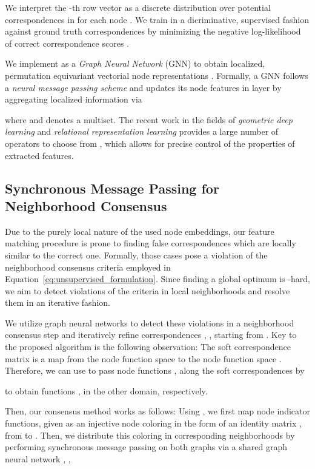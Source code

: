 \documentclass{article}
\begin{document}
We interpret the -th row vector  as a discrete distribution over potential correspondences in  for each node .
We train  in a dicriminative, supervised fashion against ground truth correspondences  by minimizing the negative log-likelihood of correct correspondence scores .

We implement  as a \emph{Graph Neural Network} (GNN) to obtain localized, permutation equivariant vectorial node representations \citep{Bronstein/etal/2017,Hamilton/etal/2017,Battaglia/etal/2018,Goyal/Ferrara/2018}.
Formally, a GNN follows a \emph{neural message passing scheme} \citep{Gilmer/etal/2017} and updates its node features  in layer  by aggregating localized information via

where  and  denotes a multiset.
The recent work in the fields of \emph{geometric deep learning} and \emph{relational representation learning} provides a large number of operators to choose from \citep{Kipf/Welling/2017,Gilmer/etal/2017,Velickovic/etal/2018,Schlichtkrull/etal/2018,Xu/etal/2019b}, which allows for precise control of the properties of extracted features.

\subsection{Synchronous Message Passing for Neighborhood Consensus}\label{sub:parallel_message_passing_for_neighborhood_consensus}

Due to the purely local nature of the used node embeddings, our feature matching procedure is prone to finding false correspondences which are locally similar to the correct one.
Formally, those cases pose a violation of the neighborhood consensus criteria employed in Equation~\eqref{eq:unsupervised_formulation}.
Since finding a global optimum is -hard, we aim to detect violations of the criteria in local neighborhoods and resolve them in an iterative fashion.

We utilize graph neural networks to detect these violations in a neighborhood consensus step and iteratively refine correspondences , , starting from .
Key to the proposed algorithm is the following observation: The soft correspondence matrix  is a map from the node function space  to the node function space .
Therefore, we can use  to pass node functions ,  along the soft correspondences by

to obtain functions ,  in the other domain, respectively.

Then, our consensus method works as follows: Using , we first map node indicator functions, given as an injective node coloring  in the form of an identity matrix , from  to .
Then, we distribute this coloring in corresponding neighborhoods by performing synchronous message passing on both graphs via a shared graph neural network , \ie,
\end{document}
